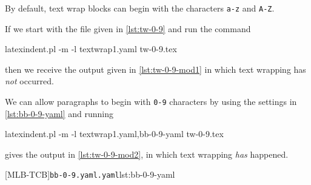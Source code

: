  \begin{example}
 By default, text wrap blocks can begin with the characters \texttt{a-z} and
 \texttt{A-Z}.

 If we start with the file given in \cref{lst:tw-0-9}
 and run the command

 \begin{commandshell}
latexindent.pl -m -l textwrap1.yaml tw-0-9.tex
\end{commandshell}

 then we receive the output given in \cref{lst:tw-0-9-mod1} in which text wrapping has
 \emph{not} occurred.

 We can allow paragraphs to begin with \texttt{0-9} characters by using the settings in
 \cref{lst:bb-0-9-yaml} and running

 \begin{commandshell}
latexindent.pl -m -l textwrap1.yaml,bb-0-9-yaml tw-0-9.tex
\end{commandshell}

 gives the output in \cref{lst:tw-0-9-mod2}, in which text wrapping \emph{has} happened.
 \begin{cmhtcbraster}[raster column skip=.1\linewidth,]
  [MLB-TCB]{\texttt{bb-0-9.yaml.yaml}}{lst:bb-0-9-yaml}
 \end{cmhtcbraster}
 \end{example}

